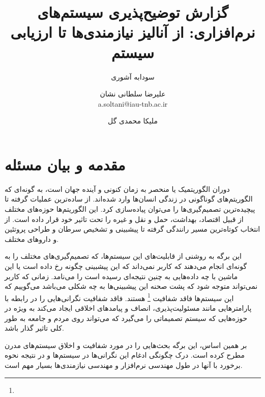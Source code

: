 \documentclass[10pt, a4paper]{article}
\title{گزارش توضیح‌پذیری سیستم‌های نرم‌افزاری: از آنالیز نیازمندی‌ها تا ارزیابی
سیستم \cite{chazette2022explainable}}
\author{
    سودابه آشوری \\
  \and
    علیرضا سلطانی نشان \\
    a.soltani@iau-tnb.ac.ir
  \and
    ملیکا محمدی گل \\
}
\begin{document}
\maketitle

\section{مقدمه و بیان مسئله}

دوران الگوریتمیک یا  منحصر به زمان کنونی و آینده جهان است،
به گونه‌ای که الگوریتم‌های گوناگونی در زندگی انسان‌ها وارد شده‌اند. از ساده‌ترین
عملیات گرفته تا پیچیده‌ترین تصمیم‌گیری‌ها را می‌توان پیاده‌سازی کرد. این
الگوریتم‌ها حوزه‌های مختلف از قبیل اقتصاد، بهداشت، حمل و نقل و غیره را تحت تاثیر
خود قرار داده است. از انتخاب کوتاه‌ترین مسیر رانندگی گرفته تا پیشبینی و تشخیص
سرطان و طراحی پروتئین و دارو‌های مختلف.

این برگه به روشنی از قابلیت‌های این سیستم‌ها، که تصمیم‌گیری‌های مختلف را به
گونه‌ای انجام می‌دهند که کاربر نمی‌داند که این پیشبینی چگونه رخ داده است یا این
ماشین با چه داده‌هایی به چنین نتیجه‌ای رسیده است را 
می‌نامد. زمانی که کاربر نمی‌تواند متوجه شود که پشت صحنه این پیشبینی‌ها به چه
شکلی می‌باشد می‌گوییم که این سیستم‌ها فاقد شفافیت \footnote{}
هستند. فاقد شفافیت نگرانی‌هایی را در رابطه با پارامتر‌هایی مانند مسئولیت‌پذیری،
انصاف و پیامد‌های اخلاقی ایجاد می‌کند به ویژه در حوزه‌هایی که سیستم تصمیماتی را
می‌گیرد که می‌تواند روی مردم و جامعه به طور کلی تاثیر گذار باشد.

بر همین اساس، این برگه بحث‌هایی را در مورد شفافیت و اخلاق سیستم‌های مدرن مطرح
کرده است. درک چگونگی ادغام این نگرانی‌ها در سیستم‌ها و در نتیجه نحوه برخورد با
آنها در طول مهندسی نرم‌افزار و مهندسی نیازمندی‌ها بسیار مهم است.

\newpage
\tableofcontents
\newpage

\listoffigures
\newpage



\newpage


\end{document}
